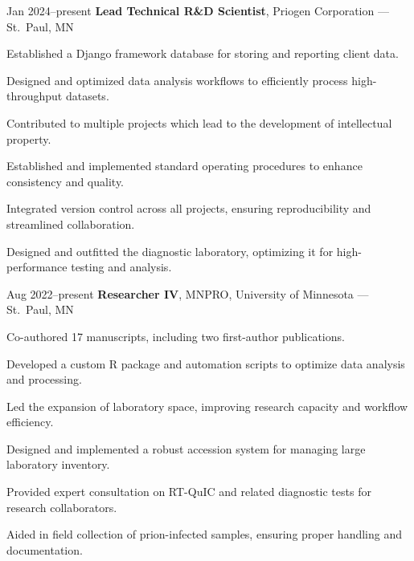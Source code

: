 \documentclass{resume}
\begin{document}
        \begin{twocolentry}{Jan 2024--present}
            \textbf{Lead Technical R\&D Scientist}, Priogen Corporation --- St.\ Paul, MN
        \end{twocolentry}
        \begin{onecolentry}
            \begin{highlights}
                \item Established a Django framework database for storing and reporting client data.
                \item Designed and optimized data analysis workflows to efficiently process high-throughput datasets.
                \item Contributed to multiple projects which lead to the development of intellectual property.
                \item Established and implemented standard operating procedures to enhance consistency and quality.
                \item Integrated version control across all projects, ensuring reproducibility and streamlined collaboration.
                \item Designed and outfitted the diagnostic laboratory, optimizing it for high-performance testing and analysis.
            \end{highlights}
        \end{onecolentry}

        \begin{twocolentry}{Aug 2022--present}
            \textbf{Researcher IV}, MNPRO, University of Minnesota --- St.\ Paul, MN
        \end{twocolentry}
        \begin{onecolentry}
            \begin{highlights}
                \item Co-authored 17 manuscripts, including two first-author publications.
                \item Developed a custom R package and automation scripts to optimize data analysis and processing.
                \item Led the expansion of laboratory space, improving research capacity and workflow efficiency.
                \item Designed and implemented a robust accession system for managing large laboratory inventory.
                \item Provided expert consultation on RT-QuIC and related diagnostic tests for research collaborators.
                \item Aided in field collection of prion-infected samples, ensuring proper handling and documentation.
            \end{highlights}
        \end{onecolentry}
\end{document}
